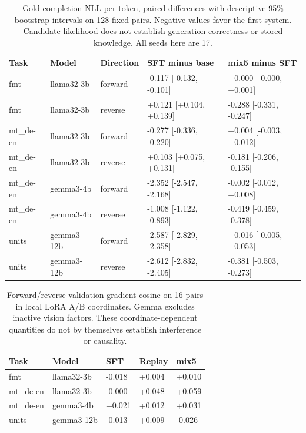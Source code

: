 \begin{table}[t]
\centering\small
\begin{tabular}{lllll}
\toprule
Task & Model & Direction & SFT minus base & mix5 minus SFT \\
\midrule
fmt & llama32-3b & forward & -0.117 [-0.132, -0.101] & +0.000 [-0.000, +0.001] \\
fmt & llama32-3b & reverse & +0.121 [+0.104, +0.139] & -0.288 [-0.331, -0.247] \\
mt\_de-en & llama32-3b & forward & -0.277 [-0.336, -0.220] & +0.004 [-0.003, +0.012] \\
mt\_de-en & llama32-3b & reverse & +0.103 [+0.075, +0.131] & -0.181 [-0.206, -0.155] \\
mt\_de-en & gemma3-4b & forward & -2.352 [-2.547, -2.168] & -0.002 [-0.012, +0.008] \\
mt\_de-en & gemma3-4b & reverse & -1.008 [-1.122, -0.893] & -0.419 [-0.459, -0.378] \\
units & gemma3-12b & forward & -2.587 [-2.829, -2.358] & +0.016 [-0.005, +0.053] \\
units & gemma3-12b & reverse & -2.612 [-2.832, -2.405] & -0.381 [-0.503, -0.273] \\
\bottomrule
\end{tabular}
\caption{Gold completion NLL per token, paired differences with descriptive 95\% bootstrap intervals on 128 fixed pairs. Negative values favor the first system. Candidate likelihood does not establish generation correctness or stored knowledge. All seeds here are 17.}
\label{tab:sprint-likelihood}
\end{table}
\begin{table}[t]
\centering\small
\begin{tabular}{lllll}
\toprule
Task & Model & SFT & Replay & mix5 \\
\midrule
fmt & llama32-3b & -0.018 & +0.004 & +0.010 \\
mt\_de-en & llama32-3b & -0.000 & +0.048 & +0.059 \\
mt\_de-en & gemma3-4b & +0.021 & +0.012 & +0.031 \\
units & gemma3-12b & -0.013 & +0.009 & -0.026 \\
\bottomrule
\end{tabular}
\caption{Forward/reverse validation-gradient cosine on 16 pairs in local LoRA A/B coordinates. Gemma excludes inactive vision factors. These coordinate-dependent quantities do not by themselves establish interference or causality.}
\label{tab:sprint-gradients}
\end{table}
